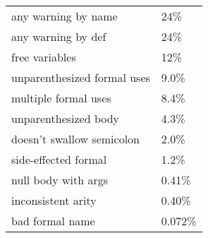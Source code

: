 \begin{tabular}{|l|l|} \hline
any warning by name & 24\% \\ 
any warning by def & 24\% \\ 
free variables & 12\% \\ 
unparenthesized formal uses & 9.0\% \\ 
multiple formal uses & 8.4\% \\ 
unparenthesized body & 4.3\% \\ 
doesn't swallow semicolon & 2.0\% \\ 
side-effected formal & 1.2\% \\ 
null body with args & 0.41\% \\ 
inconsistent arity & 0.40\% \\ 
bad formal name & 0.072\% \\ 
\hline
\end{tabular}
